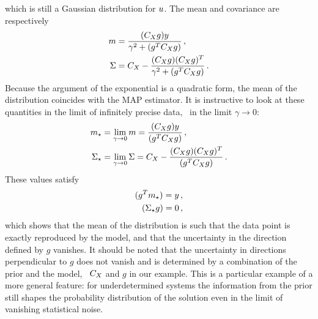 which is still a Gaussian distribution for $u$. The mean and covariance
are respectively
\begin{align}
  m &= \frac{(C_X g) y}{\gamma^2 + (g^T C_X g)}\, , \\
  \Sigma &= C_X - 
  \frac{(C_X g) (C_X g)^T}{\gamma^2 + (g^T C_X g)}\, .
\end{align}
Because the argument of the exponential is a quadratic form, the mean of the
distribution coincides with the MAP estimator. It is instructive to look at
these quantities in the limit of infinitely precise data, \ie\ in the limit
$\gamma\to 0$:
\begin{align}
  m_\star &= 
  \lim_{\gamma\to 0} m
  = \frac{(C_X g) y}{(g^T C_X g)}\, , \\
  \Sigma_\star &= 
  \lim_{\gamma\to 0} \Sigma 
  = C_X - 
  \frac{(C_X g) (C_X g)^T}{(g^T C_X g)}\, .
\end{align}
These values satisfy
\begin{align}
  (g^T m_\star) = y \, , \\
  (\Sigma_\star g) = 0 \, ,
\end{align}
which shows that the mean of the distribution is such that the data point is
exactly reproduced by the model, and that the uncertainty in the direction
defined by $g$ vanishes. It should be noted that the uncertainty in directions
perpendicular to $g$ does not vanish and is determined by a combination of the
prior and the model, \viz\ $C_X$ and $g$ in our example. This is a
particular example of a more general feature: for underdetermined systems the
information from the prior still shapes the probability distribution of the
solution even in the limit of vanishing statistical noise.  

